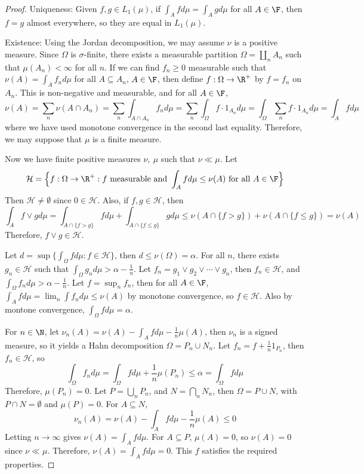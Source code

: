 \documentclass[a4paper]{article}
\begin{document}
\begin{proof}
  Uniqueness: Given $f,g\in L_1(\mu)$, if $\int_A f d\mu=\int_A g d\mu$ for all $A\in\F$, then $f=g$ almost everywhere, so they are equal in $L_1(\mu)$.

  Existence: Using the Jordan decomposition, we may assume $\nu$ is a positive measure. Since $\Omega$ is $\sigma$-finite, there exists a measurable partition $\Omega=\coprod_n A_n$ such that $\mu(A_n)<\infty$ for all $n$. If we can find $f_n\geq 0$ measurable such that $\nu(A)=\int_A f_n d\mu$ for all $A\subseteq A_n$, $A\in\F$, then define $f:\Omega\to\R^+$ by $f=f_n$ on $A_n$. This is non-negative and measurable, and for all $A\in\F$,
  \[
    \nu(A)=\sum_n\nu(A\cap A_n)=\sum_n\int_{A\cap A_n}f_nd\mu=\sum_n\int_\Omega f\cdot 1_{A_n}d\mu=\int_\Omega\sum_n f\cdot 1_{A_n}d\mu=\int_A f d\mu
  \]
where we have used monotone convergence in the second last equality. Therefore, we may suppose that $\mu$ is a finite measure.

  Now we have finite positive measures $\nu,\ \mu$ such that $\nu\ll\mu$. Let
  \[
    \mathcal{H}=\Big\{f:\Omega\to\R^+:f\text{ measurable and }\int_A fd\mu\leq\nu(A)\text{ for all }A\in\F\Big\}
  \]
  Then $\mathcal{H}\not=\emptyset$ since $0\in\mathcal{H}$. Also, if $f,g\in\mathcal{H}$, then
  \[
    \int_A f\lor g d\mu=\int_{A\cap\{f>g\}}f d\mu+\int_{A\cap\{f\leq g\}}g d\mu\leq\nu(A\cap\{f>g\})+\nu(A\cap\{f\leq g\})=\nu(A)
  \]
  Therefore, $f\lor g\in\mathcal{H}$.

  Let $d=\sup\{\int_\Omega f d\mu:f\in\mathcal{H}\}$, then $d\leq\nu(\Omega)=\alpha$. For all $n$, there exists $g_n\in\mathcal{H}$ such that $\int_\Omega g_n d\mu>\alpha-\frac{1}{n}$. Let $f_n=g_1\lor g_2\lor\cdots\lor g_n$, then $f_n\in\mathcal{H}$, and $\int_\Omega f_nd\mu>\alpha-\frac{1}{n}$. Let $f=\sup_n f_n$, then for all $A\in\F$, $\int_A f d\mu=\lim_n\int f_nd\mu\leq\nu(A)$ by monotone convergence, so $f\in\mathcal{H}$. Also by montone convergence, $\int_\Omega f d\mu=\alpha$.

  For $n\in\N$, let $\nu_n(A)=\nu(A)-\int_A f d\mu-\frac{1}{n}\mu(A)$, then $\nu_n$ is a signed measure, so it yields a Hahn decomposition $\Omega=P_n\cup N_n$. Let $f_n=f+\frac{1}{n}1_{P_n}$, then $f_n\in\mathcal{H}$, so
  \[
    \int_\Omega f_n d\mu=\int_\Omega f d\mu+\frac{1}{n}\mu(P_n)\leq\alpha=\int_\Omega f d\mu
  \]
  Therefore, $\mu(P_n)=0$. Let $P=\bigcup_n P_n$, and $N=\bigcap_n N_n$, then $\Omega=P\cup N$, with $P\cap N=\emptyset$ and $\mu(P)=0$. For $A\subseteq N$,
  \[
    \nu_n(A)=\nu(A)-\int_A f d\mu-\frac{1}{n}\mu(A)\leq 0
  \]
  Letting $n\to\infty$ gives $\nu(A)=\int_A f d\mu$. For $A\subseteq P$, $\mu(A)=0$, so $\nu(A)=0$ since $\nu\ll\mu$. Therefore, $\nu(A)=\int_A f d\mu=0$. This $f$ satisfies the required properties.
\end{proof}
\end{document}
